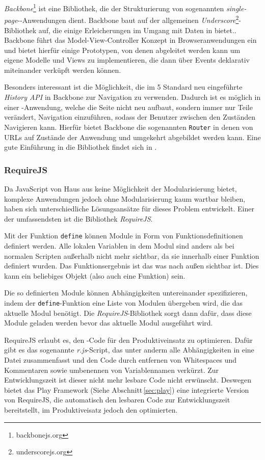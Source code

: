 \textit{Backbone}\footnote{backbonejs.org} ist eine Bibliothek, die der Strukturierung von
sogenannten \textit{single-page}--Anwendungen dient. Backbone baut auf der allgemeinen
\textit{Underscore}\footnote{underscorejs.org}-Bibliothek auf, die einige Erleicherungen im Umgang
mit Daten in  bietet.. Backbone führt das Model-View-Controller Konzept in
Browseranwendungen ein und bietet hierfür einige Prototypen, von denen abgeleitet werden kann um
eigene Modelle und Views zu implementieren, die dann über Events deklarativ miteinander verküpft
werden können.

Besonders interessant ist die Möglichkeit, die im 5 Standard neu eingeführte
\textit{History API} in Backbone zur Navigation zu verwenden. Dadurch ist es möglich in einer
-Anwendung, welche die Seite nicht neu aufbaut, sondern immer nur Teile verändert,
Navigation einzuführen, sodass der Benutzer zwischen den Zuständen Navigieren kann. Hierfür bietet
Backbone die sogenannten \texttt{Router} in denen von URLs auf Zustände der Anwendung und umgekehrt
abgebildet werden kann. Eine gute Einführung in die Bibliothek findet sich in \cite{backbone}.

\subsubsection{RequireJS}
\label{sec:requirejs}

Da JavaScript von Haus aus keine Möglichkeit der Modularisierung bietet, komplexe Anwendungen
jedoch ohne Modularisierung kaum wartbar bleiben, haben sich unterschiedliche Lösungsansätze für
dieses Problem entwickelt. Einer der  umfassendsten ist die Bibliothek \textit{RequireJS}.

Mit der Funktion \texttt{define} können Module in Form von Funktionsdefinitionen  definiert werden.
Alle lokalen Variablen in dem Modul sind anders als bei  normalen Scripten außerhalb nicht mehr
sichtbar, da sie innerhalb einer  Funktion definiert wurden. Das Funktionsergebnis ist das was nach
außen sichtbar  ist. Dies kann ein beliebiges Objekt (also auch eine Funktion) sein.

Die so definierten Module können Abhängigkeiten untereinander spezifizieren,  indem der
\texttt{define}-Funktion eine Liste von Modulen übergeben wird, die  das aktuelle Modul benötigt.
Die \textit{RequireJS}-Bibliothek sorgt dann dafür,  dass diese Module geladen werden bevor das
aktuelle Modul ausgeführt wird.

RequireJS erlaubt es, den  -Code für den Produktiveinsatz zu optimieren. Dafür
gibt es  das sogenannte \textit{r.js}-Script, das unter anderm alle Abhängigkeiten in eine Datei
zusammenfasst und den Code durch entfernen von Whitespaces und Kommentaren  sowie umbenennen
von Variablennamen verkürzt. Zur Entwicklungszeit ist dieser nicht mehr lesbare Code nicht
erwünscht. Deswegen bietet das Play Framework (Siehe Abschnitt\,\ref{sec:play}) eine integrierte
Version von RequireJS, die automatisch den lesbaren Code zur Entwicklungszeit  bereitstellt, im
Produktiveisatz jedoch den optimierten.